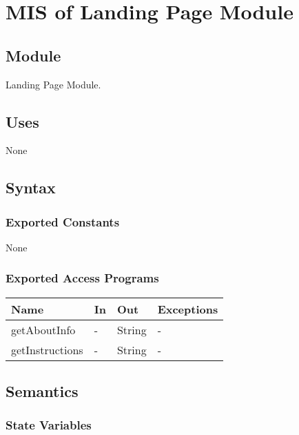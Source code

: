 \documentclass[12pt, titlepage]{article}
\begin{document}

\newpage


\section{MIS of Landing Page Module} \label{Module} 

\subsection{Module}

Landing Page Module.

\subsection{Uses}

None

\subsection{Syntax}

\subsubsection{Exported Constants}

None

\subsubsection{Exported Access Programs}

\begin{center}
\begin{tabular}{p{4cm} p{4cm} p{2cm} p{2cm}}
\hline
\textbf{Name} & \textbf{In} & \textbf{Out} & \textbf{Exceptions} \\
\hline
getAboutInfo & - & String & - \\
getInstructions & - & String & - \\
\hline
\end{tabular}
\end{center}

\subsection{Semantics}

\subsubsection{State Variables}
\end{document}
